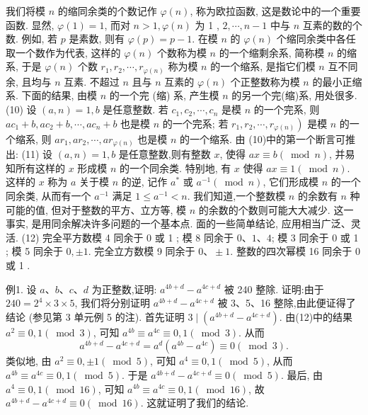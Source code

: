 我们将模 $n$ 的缩同余类的个数记作 $\varphi(n)$, 称为欧拉函数, 这是数论中的一个重要函数.
显然, $\varphi(1)=1$, 而对 $n>1, \varphi(n)$ 为 1 , $2, \cdots, n-1$ 中与 $n$ 互素的数的个数.
例如, 若 $p$ 是素数, 则有 $\varphi(p)=p-1$.
在模 $n$ 的 $\varphi(n)$ 个缩同余类中各任取一个数作为代表, 这样的 $\varphi(n)$ 个数称为模 $n$ 的一个缩剩余系, 简称模 $n$ 的缩系, 于是 $\varphi(n)$ 个数 $r_1, r_2, \cdots, r_{\varphi(n)}$ 称为模 $n$ 的一个缩系, 是指它们模 $n$ 互不同余, 且均与 $n$ 互素.
不超过 $n$ 且与 $n$ 互素的 $\varphi(n)$ 个正整数称为模 $n$ 的最小正缩系.
下面的结果, 由模 $n$ 的一个完 (缩) 系, 产生模 $n$ 的另一个完(缩)系, 用处很多.
(10) 设 $(a, n)=1, b$ 是任意整数.
若 $c_1, c_2, \cdots, c_n$ 是模 $n$ 的一个完系, 则 $a c_1+b, a c_2+b, \cdots, a c_n+b$ 也是模 $n$ 的一个完系;
若 $\left.r_1, r_2, \cdots, r_{\varphi(n)}\right)$ 是模 $n$ 的一个缩系, 则 $a r_1, a r_2, \cdots, a r_{\varphi(n)}$ 也是模 $n$ 的一个缩系.
由 (10)中的第一个断言可推出:
(11) 设 $(a, n)=1, b$ 是任意整数,则有整数 $x$, 使得 $a x \equiv b(\bmod n)$, 并易知所有这样的 $x$ 形成模 $n$ 的一个同余类.
特别地, 有 $x$ 使得 $a x \equiv 1(\bmod n)$. 这样的 $x$ 称为 $a$ 关于模 $n$ 的逆, 记作 $a^*$ 或 $a^{-1}(\bmod n)$, 它们形成模 $n$ 的一个同余类, 从而有一个 $a^{-1}$ 满足 $1 \leqslant a^{-1}<n$.
我们知道,一个整数模 $n$ 的余数有 $n$ 种可能的值, 但对于整数的平方、立方等, 模 $n$ 的余数的个数则可能大大减少.
这一事实, 是用同余解决许多问题的一个基本点.
面的一些简单结论, 应用相当广泛、灵活.
(12) 完全平方数模 4 同余于 0 或 1 ; 模 8 同余于 $0 、 1 、 4$; 模 3 同余于 0 或 1 ; 模 5 同余于 $0, \pm 1$.
完全立方数模 9 同余于 $0 、 \pm 1$.
整数的四次幂模 16 同余于 0 或 1 .



例1. 设 $a 、 b 、 c 、 d$ 为正整数,证明: $a^{4 b+d}-a^{4 c+d}$ 被 240 整除.
证明:由于 $240=2^4 \times 3 \times 5$, 我们将分别证明 $a^{4 b+d}-a^{4 c+d}$ 被 3、5、16 整除,由此便证得了结论 (参见第 3 单元例 5 的注).
首先证明 $3 \mid\left(a^{4 b+d}-a^{4 c+d}\right)$. 由(12)中的结果 $a^2 \equiv 0,1(\bmod 3)$, 可知 $a^{4 b} \equiv a^{4 c} \equiv 0,1(\bmod 3)$. 从而
$$
a^{4 b+d}-a^{4 c+d}=a^d\left(a^{4 b}-a^{4 c}\right) \equiv 0(\bmod 3) .
$$
类似地, 由 $a^2 \equiv 0, \pm 1(\bmod 5)$, 可知 $a^4 \equiv 0,1(\bmod 5)$, 从而 $a^{4 b} \equiv a^{4 c} \equiv 0,1(\bmod 5)$. 于是 $a^{4 b+d}-a^{4 c+d} \equiv 0(\bmod 5)$.
最后, 由 $a^4 \equiv 0,1(\bmod 16)$, 可知 $a^{4 b} \equiv a^{4 c} \equiv 0,1(\bmod 16)$, 故 $a^{4 b+d}- a^{4 c+d} \equiv 0(\bmod 16)$. 这就证明了我们的结论.



